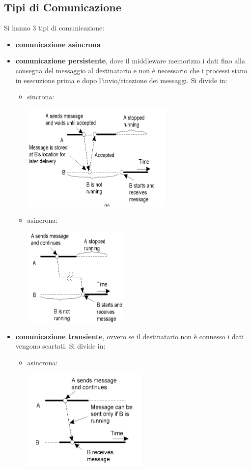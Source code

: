 \documentclass[a4paper,12pt, oneside]{book}
\begin{document}
\subsection{Tipi di Comunicazione}
Si hanno 3 tipi di comunicazione:
\begin{itemize}
	\item \textbf{comunicazione asincrona}
	\item \textbf{comunicazione persistente}, dove il middleware memorizza i dati fino alla consegna del messaggio al destinatario e non è necessario che i processi siano in esecuzione prima e dopo l'invio/ricezione dei messaggi. Si divide in:
	\begin{itemize}
		\item sincrona:
		\begin{center}
			\includegraphics[scale=0.8]{img/sin.png}
        \end{center}
		\item asincrona:
		\begin{center}
			\includegraphics[scale=0.8]{img/asin.png}
		\end{center}
	\end{itemize}
	\item \textbf{comunicazione transiente}, ovvero se il destinatario non è connesso i dati vengono scartati. Si divide in:
	\begin{itemize}
		\item asincrona:
		\begin{center}
			\includegraphics[scale=0.8]{img/asin2.png}

\end{center}
\end{itemize}
\end{itemize}
\end{document}
